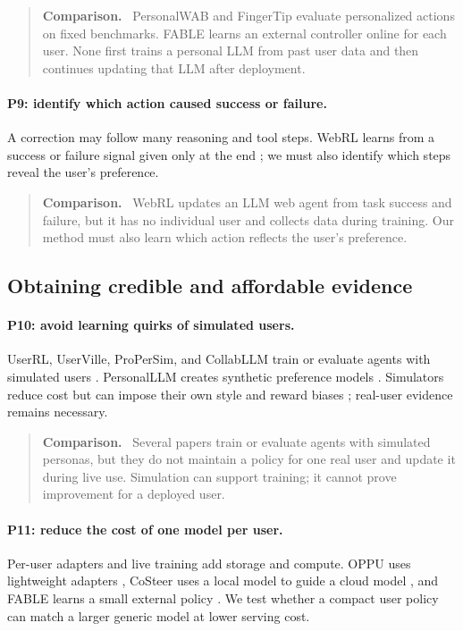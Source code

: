 \documentclass[11pt]{article}
\newenvironment{settingpointer}
  {\begin{quote}\small\noindent\textbf{Comparison.}\ }
  {\end{quote}}
\begin{document}
\begin{settingpointer}
PersonalWAB and FingerTip evaluate personalized actions on fixed benchmarks.
FABLE learns an external controller online for each user.  None first trains a
personal LLM from past user data and then continues updating that LLM after
deployment.
\end{settingpointer}

\paragraph{P9: identify which action caused success or failure.}
A correction may follow many reasoning and tool steps.  WebRL learns from a
success or failure signal given only at the end \citep{qi2025webrl}; we must
also identify which steps reveal the user's preference.

\begin{settingpointer}
WebRL updates an LLM web agent from task success and failure, but it has no
individual user and collects data during training.  Our method must also learn
which action reflects the user's preference.
\end{settingpointer}

\subsection{Obtaining credible and affordable evidence}

\paragraph{P10: avoid learning quirks of simulated users.}
UserRL, UserVille, ProPerSim, and CollabLLM train or evaluate agents with
simulated users
\citep{qian2025userrl,sun2025userville,kim2025propersim,wu2025collabllm}.
PersonalLLM creates synthetic preference models \citep{zollo2024personalllm}.
Simulators reduce cost but can impose their own style and reward biases
\citep{rezk2025rmcrisis}; real-user evidence remains necessary.

\begin{settingpointer}
Several papers train or evaluate agents with simulated personas, but they do
not maintain a policy for one real user and update it during live use.
Simulation can support training; it cannot prove improvement for a deployed
user.
\end{settingpointer}

\paragraph{P11: reduce the cost of one model per user.}
Per-user adapters and live training add storage and compute.  OPPU uses
lightweight adapters \citep{tan2024oppu}, CoSteer uses a local model to guide a
cloud model \citep{lv2025costeer}, and FABLE learns a small external policy
\citep{jin2026fable}.  We test whether a compact user policy can match a
larger generic model at lower serving cost.
\end{document}
